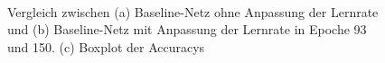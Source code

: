 \begin{figure}
     \centering
     \\
     \caption{Vergleich zwischen (a) Baseline-Netz ohne Anpassung der Lernrate und (b) Baseline-Netz mit Anpassung der Lernrate in Epoche 93 und 150. (c)  Boxplot der Accuracys}
     \label{abb:BaseAcc}
\end{figure}

